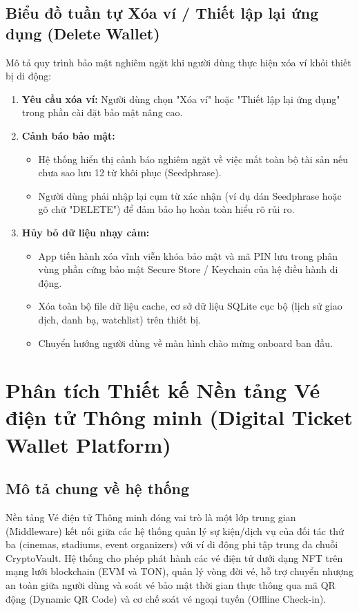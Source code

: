 \documentclass[a4paper]{report}
\begin{document}
\subsection{Biểu đồ tuần tự Xóa ví / Thiết lập lại ứng dụng (Delete Wallet)}


Mô tả quy trình bảo mật nghiêm ngặt khi người dùng thực hiện xóa ví khỏi thiết bị di động:
\begin{enumerate}
    \item \textbf{Yêu cầu xóa ví:} Người dùng chọn "Xóa ví" hoặc "Thiết lập lại ứng dụng" trong phần cài đặt bảo mật nâng cao.
    \item \textbf{Cảnh báo bảo mật:}
    \begin{itemize}
        \item Hệ thống hiển thị cảnh báo nghiêm ngặt về việc mất toàn bộ tài sản nếu chưa sao lưu 12 từ khôi phục (Seedphrase).
        \item Người dùng phải nhập lại cụm từ xác nhận (ví dụ dán Seedphrase hoặc gõ chữ "DELETE") để đảm bảo họ hoàn toàn hiểu rõ rủi ro.
    \end{itemize}
    \item \textbf{Hủy bỏ dữ liệu nhạy cảm:}
    \begin{itemize}
        \item App tiến hành xóa vĩnh viễn khóa bảo mật và mã PIN lưu trong phân vùng phần cứng bảo mật Secure Store / Keychain của hệ điều hành di động.
        \item Xóa toàn bộ file dữ liệu cache, cơ sở dữ liệu SQLite cục bộ (lịch sử giao dịch, danh bạ, watchlist) trên thiết bị.
        \item Chuyển hướng người dùng về màn hình chào mừng onboard ban đầu.
    \end{itemize}
\end{enumerate}

\section{Phân tích Thiết kế Nền tảng Vé điện tử Thông minh (Digital Ticket Wallet Platform)}

\subsection{Mô tả chung về hệ thống}
Nền tảng Vé điện tử Thông minh đóng vai trò là một lớp trung gian (Middleware) kết nối giữa các hệ thống quản lý sự kiện/dịch vụ của đối tác thứ ba (cinemas, stadiums, event organizers) với ví di động phi tập trung đa chuỗi CryptoVault. Hệ thống cho phép phát hành các vé điện tử dưới dạng NFT trên mạng lưới blockchain (EVM và TON), quản lý vòng đời vé, hỗ trợ chuyển nhượng an toàn giữa người dùng và soát vé bảo mật thời gian thực thông qua mã QR động (Dynamic QR Code) và cơ chế soát vé ngoại tuyến (Offline Check-in).
\end{document}
